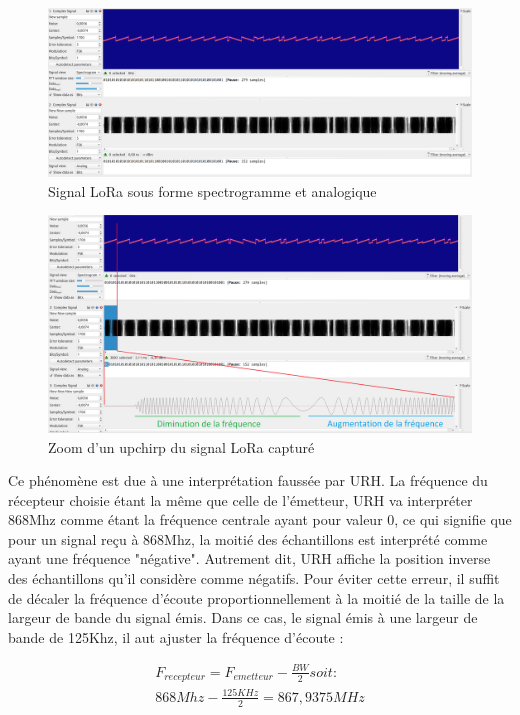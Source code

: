 \begin{figure}[h]
\centering

\includegraphics[width=\textwidth]{images/urh4.png}
\caption{Signal LoRa sous forme spectrogramme et analogique}\label{term306}
\end{figure}

\begin{figure}[h]
\centering

\includegraphics[width=\textwidth]{images/urh5.png}
\caption{Zoom d'un upchirp du signal LoRa capturé}\label{term307}
\end{figure}

Ce phénomène est due à une interprétation faussée par URH. La fréquence du récepteur choisie étant la même que celle de l'émetteur, URH va interpréter 868Mhz comme étant la fréquence centrale ayant pour valeur 0, ce qui signifie que pour un signal reçu à 868Mhz, la moitié des échantillons est interprété comme ayant une fréquence "négative". Autrement dit, URH affiche la position inverse des échantillons qu'il considère comme négatifs. Pour éviter cette erreur, il suffit de décaler la fréquence d'écoute proportionnellement à la moitié de la taille de la largeur de bande du signal émis. Dans ce cas, le signal émis à une largeur de bande de 125Khz, il aut ajuster la fréquence d'écoute :

\begin{align}
    F_{recepteur} = F_{emetteur} - \frac{BW}{2} soit: \\
    868Mhz - \frac{125KHz}{2} = 867,9375MHz
\end{align}



